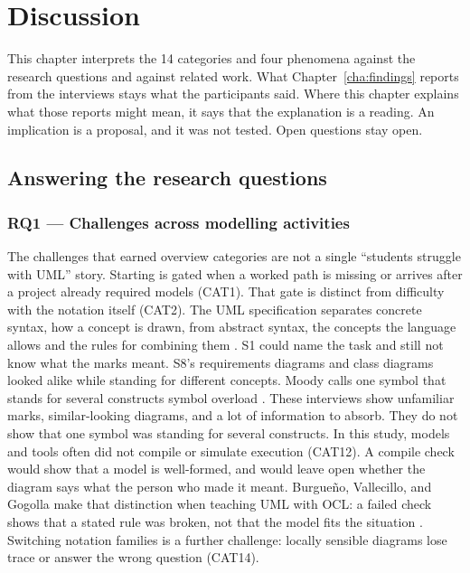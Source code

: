 
%

\chapter{Discussion}
\label{cha:discussion}

This chapter interprets the 14 categories and four phenomena against the research questions and against related work. What Chapter~\ref{cha:findings} reports from the interviews stays what the participants said. Where this chapter explains what those reports might mean, it says that the explanation is a reading. An implication is a proposal, and it was not tested. Open questions stay open.

\section{Answering the research questions}
\label{sec:disc_rqs}

\subsection{RQ1 --- Challenges across modelling activities}

The challenges that earned overview categories are not a single ``students struggle with UML'' story. Starting is gated when a worked path is missing or arrives after a project already required models (CAT1). That gate is distinct from difficulty with the notation itself (CAT2). The UML specification separates concrete syntax, how a concept is drawn, from abstract syntax, the concepts the language allows and the rules for combining them \cite{omg2017uml}. S1 could name the task and still not know what the marks meant. S8's requirements diagrams and class diagrams looked alike while standing for different concepts. Moody calls one symbol that stands for several constructs symbol overload \cite{moody2009physics}. These interviews show unfamiliar marks, similar-looking diagrams, and a lot of information to absorb. They do not show that one symbol was standing for several constructs. In this study, models and tools often did not compile or simulate execution (CAT12). A compile check would show that a model is well-formed, and would leave open whether the diagram says what the person who made it meant. Burgue{\~n}o, Vallecillo, and Gogolla make that distinction when teaching UML with OCL: a failed check shows that a stated rule was broken, not that the model fits the situation \cite{burgueno2018teaching}. Switching notation families is a further challenge: locally sensible diagrams lose trace or answer the wrong question (CAT14).

